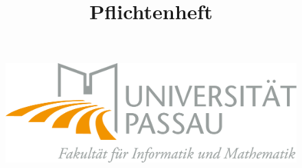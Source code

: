 \documentclass[10pt]{scrreprt}
\begin{document}
\thispagestyle{empty}
\title{Pflichtenheft}

\begin{figure}
	\begin{flushright}
		\includegraphics[scale=0.5]{uniLogo.png}
		\vspace{2.0 cm}
	\end{flushright}
\end{figure}
\end{document}
